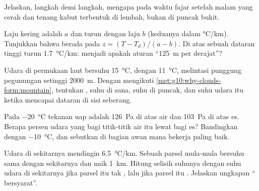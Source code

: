 \begin{exercise}[$\star\star$]\label{exo:g10:why-clouds-form:11}
Jelaskan, langkah demi langkah, mengapa pada waktu fajar setelah malam yang
cerah dan tenang kabut terbentuk di lembah, bukan di puncak bukit.
\end{exercise}

\begin{exercise}[$\star\star\star$]\label{exo:g10:why-clouds-form:12}
Laju kering adalah $a$ dan  turun dengan laju $b$ (keduanya dalam
\unit{\degreeCelsius/km}). Tunjukkan bahwa  berada pada
$z = (T - T_d)/(a - b)$. Di atas sebuah dataran tinggi  turun
\qty{1.7}{\degreeCelsius/km}: menjadi apakah aturan ``\qty{125}{m} per
derajat''?
\end{exercise}

\begin{exercise}[$\star\star\star$]\label{exo:g10:why-clouds-form:13}
Udara di permukaan laut bersuhu \qty{15}{\degreeCelsius}, dengan 
\qty{11}{\degreeCelsius}, melintasi punggung pegunungan setinggi
\qty{2000}{m}. Dengan mengikuti \cref{met:g10:why-clouds-form:mountain},
tentukan , suhu di sana, suhu di puncak, dan suhu udara itu
ketika mencapai dataran di sisi seberang.
\end{exercise}

\begin{exercise}[$\star\star\star$]\label{exo:g10:why-clouds-form:14}
Pada \qty{-20}{\degreeCelsius} tekanan uap  adalah \qty{126}{Pa} di atas
air dan \qty{103}{Pa} di atas es. Berapa persen udara yang  bagi
titik-titik air itu lewat  bagi es? Bandingkan dengan
\qty{-10}{\degreeCelsius}, dan sebutkan di bagian awan mana 
bekerja paling baik.
\end{exercise}

\begin{exercise}[$\star\star\star$]\label{exo:g10:why-clouds-form:15}
Udara di sekitarnya mendingin \qty{6.5}{\degreeCelsius/km}. Sebuah parsel
mula-mula bersuhu sama dengan sekitarnya dan naik \qty{1}{km}. Hitung selisih
suhunya dengan suhu udara di sekitarnya jika parsel itu tak , lalu jika
parsel itu . Jelaskan ungkapan `` bersyarat''.
\end{exercise}

